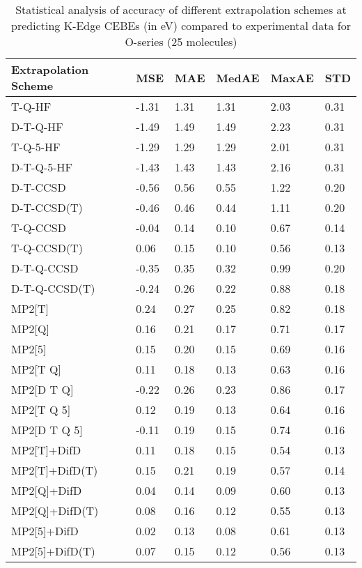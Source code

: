 \begin{table}
  \caption{Statistical analysis of accuracy of different extrapolation schemes at predicting K-Edge CEBEs (in eV) compared to experimental data for O-series (25 molecules)}
  \label{tbl:summary-o}
  \begin{tabular}{l l l l l l }
    \toprule
    \textbf{Extrapolation Scheme} & \textbf{MSE} & \textbf{MAE} & \textbf{MedAE} & \textbf{MaxAE} & \textbf{STD} \\ 
    \midrule
    T-Q-HF & -1.31 & 1.31 & 1.31 & 2.03 & 0.31 \\ 
    D-T-Q-HF & -1.49 & 1.49 & 1.49 & 2.23 & 0.31 \\ 
    T-Q-5-HF & -1.29 & 1.29 & 1.29 & 2.01 & 0.31 \\ 
    D-T-Q-5-HF & -1.43 & 1.43 & 1.43 & 2.16 & 0.31 \\ 
    D-T-CCSD & -0.56 & 0.56 & 0.55 & 1.22 & 0.20 \\ 
    D-T-CCSD(T) & -0.46 & 0.46 & 0.44 & 1.11 & 0.20 \\ 
    T-Q-CCSD & -0.04 & 0.14 & 0.10 & 0.67 & 0.14 \\ 
    T-Q-CCSD(T) & 0.06 & 0.15 & 0.10 & 0.56 & 0.13 \\ 
    D-T-Q-CCSD & -0.35 & 0.35 & 0.32 & 0.99 & 0.20 \\ 
    D-T-Q-CCSD(T) & -0.24 & 0.26 & 0.22 & 0.88 & 0.18 \\ 
    MP2[T] & 0.24 & 0.27 & 0.25 & 0.82 & 0.18 \\ 
    MP2[Q] & 0.16 & 0.21 & 0.17 & 0.71 & 0.17 \\ 
    MP2[5] & 0.15 & 0.20 & 0.15 & 0.69 & 0.16 \\ 
    MP2[T Q] & 0.11 & 0.18 & 0.13 & 0.63 & 0.16 \\ 
    MP2[D T Q] & -0.22 & 0.26 & 0.23 & 0.86 & 0.17 \\ 
    MP2[T Q 5] & 0.12 & 0.19 & 0.13 & 0.64 & 0.16 \\ 
    MP2[D T Q 5] & -0.11 & 0.19 & 0.15 & 0.74 & 0.16 \\ 
    MP2[T]+DifD & 0.11 & 0.18 & 0.15 & 0.54 & 0.13 \\ 
    MP2[T]+DifD(T) & 0.15 & 0.21 & 0.19 & 0.57 & 0.14 \\ 
    MP2[Q]+DifD & 0.04 & 0.14 & 0.09 & 0.60 & 0.13 \\ 
    MP2[Q]+DifD(T) & 0.08 & 0.16 & 0.12 & 0.55 & 0.13 \\ 
    MP2[5]+DifD & 0.02 & 0.13 & 0.08 & 0.61 & 0.13 \\ 
    MP2[5]+DifD(T) & 0.07 & 0.15 & 0.12 & 0.56 & 0.13 \\ 

\end{tabular}
\end{table}
